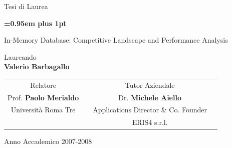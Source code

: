 \begin{titlepage}
\begin{center}
        {\LARGE{Tesi di Laurea}\par}
\end{center}

\vspace{0.5cm}
\begin{center}
        {\huge\bf \baselineskip=0.95em plus 1pt \expandafter{
In-Memory Database: Competitive Landscape and Performance Analysis
        \par}}
\end{center}

\vspace{1cm}
\begin{center}
        {\rm{Laureando}}\\
        {\large\textbf{Valerio Barbagallo}}
\end{center}



\vspace{0.5cm}

\begin{tabular}{c p{3.3cm}c c}



Relatore & & Tutor Aziendale \\
Prof. \textbf{Paolo Merialdo} & & Dr. \textbf{Michele Aiello}\\
{\small Universit\`a Roma Tre} & & {\small Applications Director \& Co. Founder}\\
& & ERIS4 s.r.l.\\
\end{tabular}
\vspace{1.5 cm}



\vspace{0.5cm}
\begin{center}
\large{Anno Accademico 2007-2008}
\end{center}
\par
\vfill\par 
\clearpage
\endgroup
\end{titlepage}
